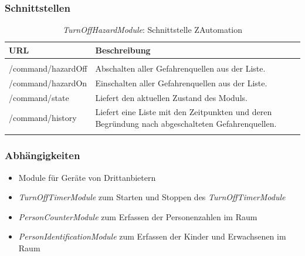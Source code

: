 \subsubsection{Schnittstellen}
\begin{longtabu} to 
	\hline
	\textbf{URL}				& \textbf{Beschreibung} \\
	\hline
	\endhead
	
	  \\
	\endfoot
	\endlastfoot
	/command/hazardOff			& Abschalten aller Gefahrenquellen aus der Liste. \\
	\hline
	/command/hazardOn			& Einschalten aller Gefahrenquellen aus der Liste. \\
	\hline 
	/command/state				& Liefert den aktuellen Zustand des Moduls. \\
	\hline
	/command/history			& Liefert eine Liste mit den Zeitpunkten und deren Begründung nach abgeschalteten Gefahrenquellen. \\
	\hline
	
	\caption{\emph{TurnOffHazardModule}: Schnittstelle ZAutomation}
\end{longtabu}

\subsubsection{Abhängigkeiten}
\begin{itemize}
	\item Module für Geräte von Drittanbietern
	\item \emph{TurnOffTimerModule} zum Starten und Stoppen des \emph{TurnOffTimerModule}
	\item \emph{PersonCounterModule} zum Erfassen der Personenzahlen im Raum
	\item \emph{PersonIdentificationModule} zum Erfassen der Kinder und Erwachsenen im Raum
\end{itemize}


